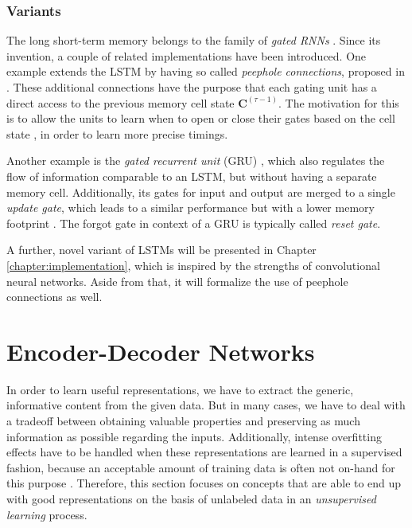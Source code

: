 \subsubsection{Variants}

The long short-term memory belongs to the family of \textit{gated RNNs} \parencite[p. 411]{deep_learning}. Since its invention, a couple of related implementations have been introduced. One example extends the LSTM by having so called \textit{peephole connections}, proposed in \parencite{lstm_peep}. These additional connections have the purpose that each gating unit has a direct access to the previous memory cell state $ \textbf{C}^{(\tau-1)} $. The motivation for this is to allow the units to learn when to open or close their gates based on the cell state \parencite{lstm-space}, in order to learn more precise timings.

Another example is the \textit{gated recurrent unit} (GRU) \parencite{gru}, which also regulates the flow of information comparable to an LSTM, but without having a separate memory cell. Additionally, its gates for input and output are merged to a single \textit{update gate}, which leads to a similar performance but with a lower memory footprint \parencite{gru-video}. The forgot gate in context of a GRU is typically called \textit{reset gate}.

A further, novel variant of LSTMs will be presented in Chapter \ref{chapter:implementation}, which is inspired by the strengths of convolutional neural networks. Aside from that, it will formalize the use of peephole connections as well.


\section{Encoder-Decoder Networks}

In order to learn useful representations, we have to extract the generic, informative content from the given data. But in many cases, we have to deal with a tradeoff between obtaining valuable properties and preserving as much information as possible regarding the inputs. Additionally, intense overfitting effects have to be handled when these representations are learned in a supervised fashion, because an acceptable amount of training data is often not on-hand for this purpose \parencite[p. 527]{deep_learning}. Therefore, this section focuses on concepts that are able to end up with good representations on the basis of unlabeled data in an \textit{unsupervised learning} process. 


